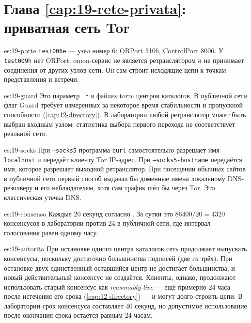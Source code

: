 \section*{Глава \ref{cap:19-rete-privata}: приватная сеть Tor}

\begin{soluzione}{es:19-porte}
\texttt{test006e} — узел номер 6: ORPort 5106, ControlPort 8006. У \texttt{test009h} нет ORPort: onion-сервис не является ретранслятором и не принимает соединения от других узлов сети. Он сам строит исходящие цепи к точкам представления и встречи.
\end{soluzione}

\begin{soluzione}{es:19-guard}
Это параметр ~\texttt{*} в файлах torrc центров каталогов. В публичной сети флаг Guard требует измеренных за некоторое время стабильности и пропускной способности (\cref{cap:12-directory}). В лаборатории любой ретранслятор может быть выбран входным узлом: статистика выбора первого перехода не соответствует реальной сети.
\end{soluzione}

\begin{soluzione}{es:19-socks}
При \texttt{--socks5} программа \texttt{curl} самостоятельно разрешает имя \texttt{localhost} и передаёт клиенту Tor IP-адрес. При \texttt{--socks5-hostname} передаётся имя, которое разрешает выходной ретранслятор. При посещении обычных сайтов в публичной сети первый способ выдавал бы доменные имена локальному DNS-резолверу и его наблюдателям, хотя сам трафик шёл бы через Tor. Это классическая утечка DNS.
\end{soluzione}

\begin{soluzione}{es:19-consenso}
Каждые 20 секунд согласно . За сутки это $86400/20 = 4320$ консенсусов в лаборатории против 24 в публичной сети, где интервал голосования равен одному часу.
\end{soluzione}

\begin{soluzione}{es:19-autorita}
При остановке одного центра каталогов сеть продолжает выпускать консенсусы, поскольку достаточно большинства подписей (две из трёх). При остановке двух единственный оставшийся центр не достигает большинства, и новый действительный консенсус не создаётся. Клиенты, однако, продолжают использовать старый консенсус как \emph{reasonably live} — ещё примерно 24 часа после истечения его срока (\cref{cap:12-directory}) — и могут долго строить цепи. В лаборатории срок консенсуса составляет 40 секунд, но допустимое использование после окончания срока остаётся равным 24 часам.
\end{soluzione}

